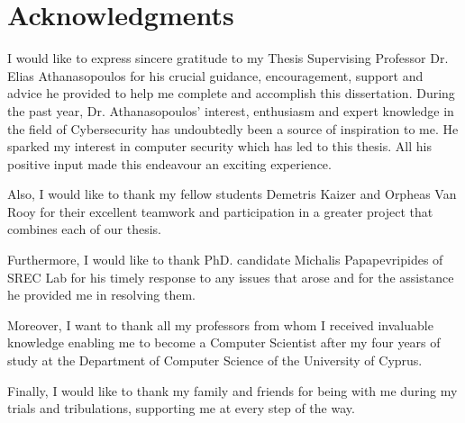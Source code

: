 \section*{\LARGE{Acknowledgments}}

I would like to express sincere gratitude to my Thesis Supervising Professor Dr. Elias Athanasopoulos for his crucial guidance, encouragement, support and advice he provided to help me complete and accomplish this dissertation. During the past year, Dr. Athanasopoulos' interest, enthusiasm and expert knowledge in the field of Cybersecurity has undoubtedly been a source of inspiration to me. He sparked my interest in computer security which has led to this thesis. All his positive input made this endeavour an exciting experience. 

Also, I would like to thank my fellow students Demetris Kaizer and Orpheas Van Rooy for their excellent teamwork and participation in a greater project that combines each of our thesis.

Furthermore, I would like to thank PhD. candidate Michalis Papapevripides of SREC Lab for his timely response to any issues that arose and for the assistance he provided me in resolving them.

Moreover, I want to thank all my professors from whom I received invaluable knowledge enabling me to become a Computer Scientist after my four years of study at the Department of Computer Science of the University of Cyprus.

Finally, I would like to thank my family and friends for being with me during my trials and tribulations, supporting me at every step of the way.
